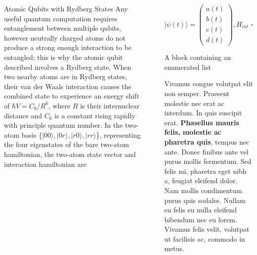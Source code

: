 \documentclass[final]{beamer}
\newlength{\sepwidth}
\newlength{\colwidth}
\newcommand{\separatorcolumn}{\begin{column}{\sepwidth}\end{column}}
\begin{document}
\begin{frame}[t]
\begin{columns}[t]
\begin{column}{\colwidth}
\begin{block}{Atomic Qubits with Rydberg States}
    Any useful quantum computation requires entanglement between multiple qubits, however neutrally charged atoms do not
    produce a strong enough interaction to be entangled; this is why the atomic qubit described involves a Rydberg state. When
    two nearby atoms are in Rydberg states, their van der Waals interaction causes the combined state to experience
    an energy shift of $\hbar V = C_6 / R^6$, where $R$ is their internuclear distance and $C_6$ is a constant rising rapidly
    with principle quantum number. In the two-atom basis \{$|00\rangle, |0r\rangle, |r0\rangle, |rr\rangle$\}, representing
    the four eigenstates of the bare two-atom hamiltonian, the two-atom state vector and interaction hamiltonian are






  \end{block}





\end{column}

\separatorcolumn

\begin{column}{\colwidth}

  $$ |\psi(t)\rangle = \begin{pmatrix}
    a(t) \\
    b(t) \\
    c(t) \\
    d(t)
    \end{pmatrix}, H_{int}= \hbar / 2
    \begin{pmatrix}
    2\Delta & \Omega e^{-i \phi_L} & \Omega e^{-i \phi_L} & 0 \\
    \Omega e^{i \phi_L} & 0 & 0 & \Omega e^{-i \phi_L} \\
    \Omega e^{i \phi_L} & 0 & 0 & \Omega e^{-i \phi_L} \\
    0 & \Omega e^{i \phi_L} & \Omega e^{i \phi_L} & -2\Delta + 2V
    \end{pmatrix}.
    $$

  \begin{block}{A block containing an enumerated list}


    Vivamus congue volutpat elit non semper. Praesent molestie nec erat ac
    interdum. In quis suscipit erat. \textbf{Phasellus mauris felis, molestie
    ac pharetra quis}, tempus nec ante. Donec finibus ante vel purus mollis
    fermentum. Sed felis mi, pharetra eget nibh a, feugiat eleifend dolor. Nam
    mollis condimentum purus quis sodales. Nullam eu felis eu nulla eleifend
    bibendum nec eu lorem. Vivamus felis velit, volutpat ut facilisis ac,
    commodo in metus.


\end{block}
\end{column}
\end{columns}
\end{frame}
\end{document}
